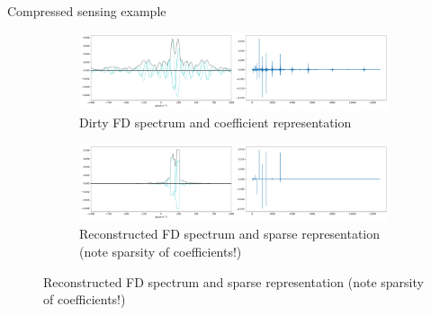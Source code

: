 \documentclass[xetex,aspectratio=169]{beamer}
\begin{document}
\begin{frame}{Compressed sensing example}
	\begin{figure}
		\centering
		\begin{subfigure}{\textwidth}
			\centering
			\includegraphics[width=.9\textwidth]{figures/cs/cs_before.pdf}
			\caption{Dirty FD spectrum and coefficient representation}
		\end{subfigure}

		\begin{subfigure}{\textwidth}
			\centering
			\includegraphics[width=.9\textwidth]{figures/cs/cs_after.pdf}
			\caption{Reconstructed FD spectrum and sparse representation (note sparsity of coefficients!)}
		\end{subfigure}
	\end{figure}
\end{frame}

%
\end{document}
